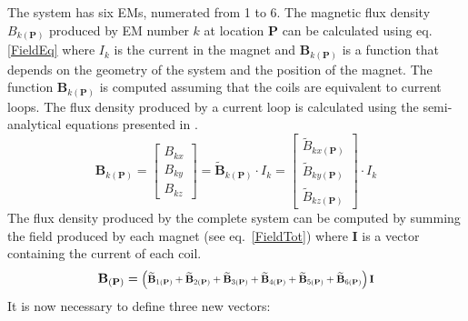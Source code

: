 The system has six EMs, numerated from 1 to 6.
The magnetic flux density $B_{k(\mathbf{P})}$ produced by EM number $k$ at location $\mathbf{P}$ can be calculated using eq. \ref{FieldEq} where $I_k$ is the current in the magnet and $\mathbf{B}_{k(\mathbf{P})}$ is a function that depends on the geometry of the system and the position of the magnet. The function $\mathbf{B}_{k(\mathbf{P})}$ is computed assuming that the coils are equivalent to current loops. The flux density produced by a current loop is calculated using the semi-analytical equations presented in \cite{simpson2001simple}.
%
\begin{equation}
\mathbf{B}_{k(\mathbf{P})}=\begin{bmatrix}
B_{kx}
\\
B_{ky} 
\\ 
B_{kz}
\end{bmatrix}=\mathbf{\widetilde{B}}_{k(\mathbf{P})}\cdot I_k=
\begin{bmatrix}
{\widetilde{B}}_{kx(\mathbf{P})}
\\
{\widetilde{B}}_{ky(\mathbf{P})}
\\ 
{\widetilde{B}}_{kz(\mathbf{P})}

\end{bmatrix}\cdot I_k
\label{FieldEq}
\end{equation}
%
The flux density produced by the complete system can be computed by summing the field produced by each magnet (see eq.~\ref{FieldTot}) where $\mathbf{I}$ is a vector containing the current of each coil.
%
\begin{dmath}
\mathbf{B}_{(\mathbf{P})}= \scalebox{.8}{$\left(\mathbf{\widetilde{B}}_{1(\mathbf{P})}+\mathbf{\widetilde{B}}_{2(\mathbf{P})}+\mathbf{\widetilde{B}}_{3(\mathbf{P})}+\mathbf{\widetilde{B}}_{4(\mathbf{P})}+\mathbf{\widetilde{B}}_{5(\mathbf{P})}+\mathbf{\widetilde{B}}_{6(\mathbf{P})}\right )\mathbf{I} $}
\label{FieldTot}
\end{dmath}
%
It is now necessary to define three new vectors:
%
